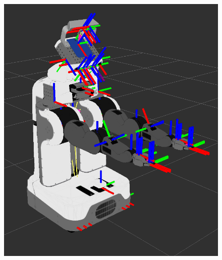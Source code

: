 \begin{figure}[!htbp]
\centering
  \subfigure%
  {
    \centering\includegraphics[height=0.3\textheight]{images/screenshots/tf01.png}
    \label{fig:tf01}
  }
  \subfigure%
  {
}
\end{figure}

